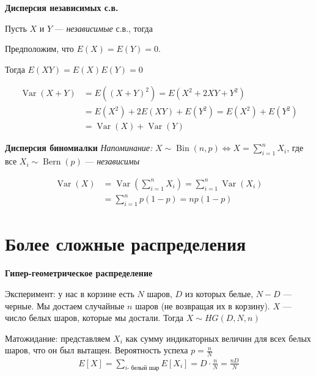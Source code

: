 \documentclass[12pt]{article}
\DeclareMathOperator{\Bin}{Bin}
\DeclareMathOperator{\Bern}{Bern}
\DeclareMathOperator{\Var}{Var}
\begin{document}
  \textbf{Дисперсия независимых с.в.}

  Пусть $X$ и $Y$ --- \emph{независимые} с.в., тогда 
  \begin{center}
  \end{center}

  
  Предположим, что $E(X) = E(Y) = 0$.
  
  Тогда $E(XY) = E(X)E(Y) = 0$
  
  \begin{align*}
    \Var(X + Y) &= E\left((X + Y)^2\right) = E\left(X^2 + 2XY + Y^2\right) \\
                &= E(X^2) + 2 E(XY) + E(Y^2) = E(X^2) + E(Y^2) \\
                &= \Var(X) + \Var(Y)
  \end{align*}



  \textbf{Дисперсия биномиалки}
  \emph{Напоминание:} $X \sim \Bin(n, p) \Leftrightarrow X = \sum_{i = 1}^n X_i$, где все $X_i \sim \Bern(p)$ --- \emph{независимы}

  \begin{align*}
    \Var(X) &= \Var\left(\sum_{i = 1}^n X_i\right) = \sum_{i = 1}^n \Var(X_i) \\
            &= \sum_{i = 1}^n p(1 - p) = np(1 - p)
  \end{align*}

  \section{Более сложные распределения}

  \textbf{Гипер-геометрическое распределение}

  Эксперимент: у нас в корзине есть $N$ шаров, $D$ из которых белые, $N-D$ --- черные. Мы достаем случайные $n$ шаров (не возвращая их в корзину). $X$ --- число белых шаров, которые мы достали. Тогда $X \sim HG(D, N, n)$

  Матожидание: представляем $X_i$ как сумму индикаторных величин для всех белых шаров, что он был вытащен. Вероятность успеха $p = \frac{n}{N}$
  \begin{align*}
      E[X] = \sum_{i \text{- белый шар}} E[X_i] = D \cdot \frac{n}{N} = \frac{nD}{N}
  \end{align*} 
\end{document}
